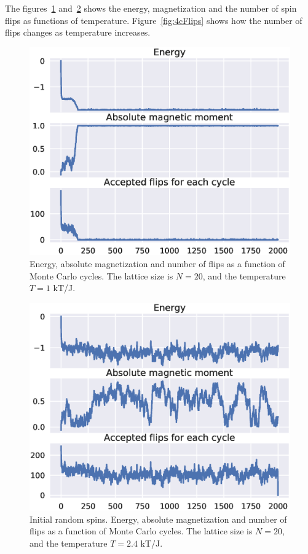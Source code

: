\documentclass[aps,reprint]{revtex4-1}
\begin{document}
The figures~\ref{fig:L20T1Random} and~\ref{fig:L20T24Random} shows the energy,
magnetization and the number of spin flips as functions of temperature.
Figure~\ref{fig:4cFlips} shows how the number of flips changes as temperature increases.
\begin{figure}[H]
  \includegraphics[width=\columnwidth]{figures/L20T1_random.eps}
  \caption{Energy, absolute magnetization and number of flips as a function of
  Monte Carlo cycles. The lattice size is $N = 20$, and the temperature $T = 1$ kT/J.}
  \label{fig:L20T1Random}
\end{figure}

\begin{figure}[H]
  \includegraphics[width=\columnwidth]{figures/L20T2_4_random.eps}
  \caption{Initial random spins. Energy, absolute magnetization and number of flips as a function of
  Monte Carlo cycles. The lattice size is $N = 20$, and the temperature $T = 2.4$ kT/J.}
  \label{fig:L20T24Random}
\end{figure}
\end{document}
